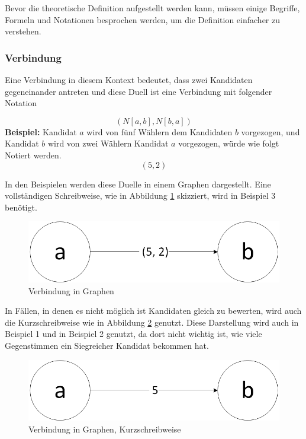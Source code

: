Bevor die theoretische Definition aufgestellt werden kann, müssen einige Begriffe, Formeln und Notationen besprochen werden, um die Definition einfacher zu verstehen.


\subsubsection{Verbindung}
\label{verbindung}
Eine Verbindung in diesem Kontext bedeutet, dass zwei Kandidaten gegeneinander antreten und diese Duell ist eine Verbindung mit folgender Notation

\[
(N[a,b],N[b,a])
\]
\textbf{Beispiel:}
Kandidat $a$ wird von fünf Wählern dem Kandidaten $b$ vorgezogen, und Kandidat $b$ wird von zwei Wählern Kandidat $a$ vorgezogen, würde wie folgt Notiert werden. 
\[
(5,2)
\]

In den Beispielen werden diese Duelle in einem Graphen dargestellt. Eine vollständigen Schreibweise, wie in Abbildung \ref{fig:verbindung1} skizziert, wird in Beispiel 3 benötigt.

\begin{figure}[!h]
\centering
\includegraphics[scale=0.5]{Bilder/Definitionab.png}
\caption{Verbindung in Graphen}
\label{fig:verbindung1}
\end{figure}

In Fällen, in denen es nicht möglich ist Kandidaten gleich zu bewerten, wird auch die Kurzschreibweise wie in Abbildung \ref{fig:verbindung2} genutzt. Diese Darstellung wird auch in Beispiel 1 und in Beispiel 2 genutzt, da dort nicht wichtig ist, wie viele Gegenstimmen ein Siegreicher Kandidat bekommen hat.

\begin{figure}[!h]
\centering
\includegraphics[scale=0.5]{Bilder/DefinitionShortab.png}
\caption{Verbindung in Graphen, Kurzschreibweise}
\label{fig:verbindung2}
\end{figure}

